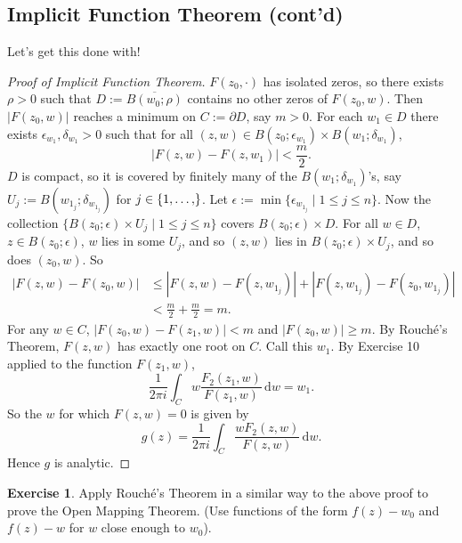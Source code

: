 \documentclass[12pt]{article}
\newcommand{\oneton}[1]{\{1,\dotsc,#1\}}
\theoremstyle{definition}
\newtheorem{exercise}{Exercise}
\theoremstyle{remark}
\begin{document}
\subsection{Implicit Function Theorem (cont'd)}
Let's get this done with!
\begin{proof}[Proof of Implicit Function Theorem]
    $F(z_0,\cdot)$ has isolated zeros, so there exists $\rho>0$ such that $D:=\overline{B(w_0;\rho)}$ contains no other zeros of $F(z_0,w)$. Then $|F(z_0,w)|$ reaches a minimum on $C:=\partial D$, say $m>0$. For each $w_1\in D$ there exists $\epsilon_{w_1},\delta_{w_1}>0$ such that for all $(z,w)\in B(z_0;\epsilon_{w_1})\times B(w_1;\delta_{w_1})$,
    \begin{equation}
        |F(z,w)-F(z,w_1)|<\frac{m}{2}.
    \end{equation}
    $D$ is compact, so it is covered by finitely many of the $B(w_1;\delta_{w_1})$'s, say $U_j:=B(w_{1_j};\delta_{w_{1_j}})$ for $j\in\oneton$. Let $\epsilon:=\min\{\epsilon_{w_{1_j}}\mid1\leq j\leq n\}$. Now the collection $\{B(z_0;\epsilon)\times U_j\mid1\leq j\leq n\}$ covers $B(z_0;\epsilon)\times D$. For all $w\in D$, $z\in B(z_0;\epsilon)$, $w$ lies in some $U_j$, and so $(z,w)$ lies in $B(z_0;\epsilon)\times U_j$, and so does $(z_0,w)$. So 
    \begin{equation}
        \begin{split}
            |F(z,w)-F(z_0,w)|&\leq|F(z,w)-F(z,w_{1_j})|+|F(z,w_{1_j})-F(z_0,w_{1_j})|\\
            &<\frac{m}{2}+\frac{m}{2}=m.
        \end{split}
    \end{equation}
    For any $w\in C$, $|F(z_0,w)-F(z_1,w)|<m$ and $|F(z_0,w)|\geq m$. By Rouch\'e's Theorem, $F(z,w)$ has exactly one root on $C$. Call this $w_1$. By Exercise 10 applied to the function $F(z_1,w)$, 
    \begin{equation}
        \frac{1}{2\pi i}\int_Cw\frac{F_2(z_1,w)}{F(z_1,w)}\,\mathrm{d}w=w_1.
    \end{equation}
    So the $w$ for which $F(z,w)=0$ is given by 
    \begin{equation}
        g(z)=\frac{1}{2\pi i}\int_C\frac{wF_2(z,w)}{F(z,w)}\,\mathrm{d}w.
    \end{equation}
    Hence $g$ is analytic.
\end{proof}
\begin{exercise}
    Apply Rouch\'e's Theorem in a similar way to the above proof to prove the Open Mapping Theorem. (Use functions of the form $f(z)-w_0$ and $f(z)-w$ for $w$ close enough to $w_0$).
\end{exercise}
\end{document}
